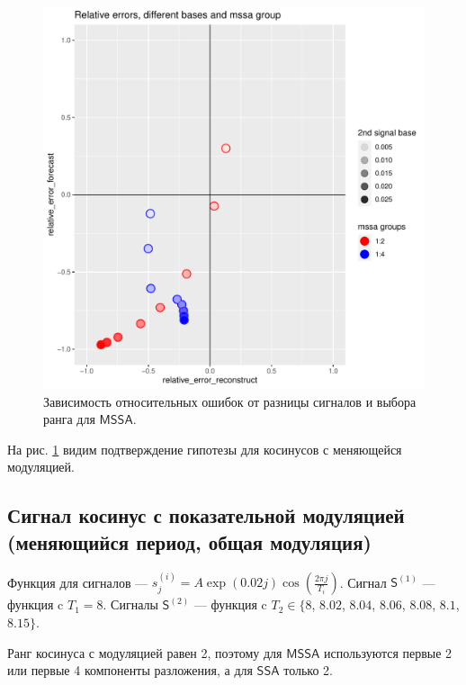 \documentclass[specialist, substylefile = spbureport.rtx,
    subf,href,colorlinks=true, 12pt]{disser}
\newcommand{\sfS}{\mathsf{S}}
\newcommand{\SSA}{\mathsf{SSA}}
\newcommand{\MSSA}{\mathsf{MSSA}}
\begin{document}
        \begin{figure}[h]
            \centering
            \includegraphics[width=\textwidth]{experiment_1_expcos1.pdf}
            \caption{Зависимость относительных ошибок от разницы сигналов и выбора ранга для $\MSSA$.}
            \label{fig:exp1_expcos1}
        \end{figure}

        На рис. \ref{fig:exp1_expcos1} видим подтверждение гипотезы для косинусов с меняющейся модуляцией.

    \subsection{Сигнал косинус с показательной модуляцией (меняющийся период, общая модуляция)}
        Функция для сигналов --- $s^{(i)}_j = A \exp(0.02j) \cos(\frac{2\pi j}{T_i})$.
        Сигнал $\sfS^{(1)}$ --- функция c $T_1 = 8$.
        Сигналы $\sfS^{(2)}$ --- функция c $T_2 \in \{8$, $8.02$, $8.04$, $8.06$, $8.08$, $8.1$, $8.15\}$.

        Ранг косинуса с модуляцией равен 2, поэтому для $\MSSA$ используются первые 2 или первые 4 компоненты разложения, а для $\SSA$ только 2.
\end{document}

